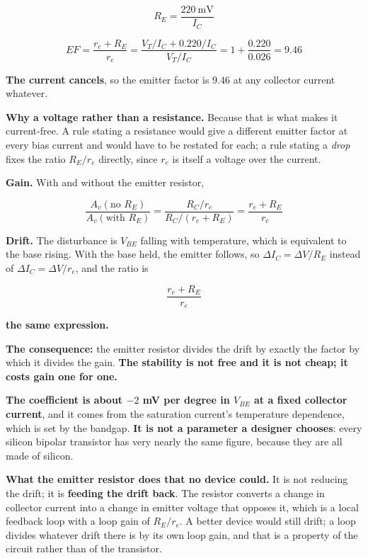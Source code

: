 
\[
  R_E = \frac{220\ \text{mV}}{I_C}
\]

\[
  EF = \frac{r_e + R_E}{r_e} = \frac{V_T/I_C + 0.220/I_C}{V_T/I_C}
  = 1 + \frac{0.220}{0.026} = \mathbf{9.46}
\]

\textbf{The current cancels}, so the emitter factor is 9.46 at any collector current whatever.

\textbf{Why a voltage rather than a resistance.} Because that is what makes it current-free. A rule stating a resistance would give a different emitter factor at every bias current and would have to be restated for each; a rule stating a \emph{drop} fixes the ratio $R_E/r_e$ directly, since $r_e$ is itself a voltage over the current.


\textbf{Gain.} With and without the emitter resistor,

\[
  \frac{A_v(\text{no } R_E)}{A_v(\text{with } R_E)} = \frac{R_C/r_e}{R_C/(r_e + R_E)}
  = \frac{r_e + R_E}{r_e}
\]

\textbf{Drift.} The disturbance is $V_{BE}$ falling with temperature, which is equivalent to the base rising. With the base held, the emitter follows, so $\Delta I_C = \Delta V/R_E$ instead of $\Delta I_C = \Delta V/r_e$, and the ratio is

\[
  \frac{r_e + R_E}{r_e}
\]

\textbf{the same expression.}

\textbf{The consequence:} the emitter resistor divides the drift by exactly the factor by which it divides the gain. \textbf{The stability is not free and it is not cheap; it costs gain one for one.}


\textbf{The coefficient is about $-2$ mV per degree in $V_{BE}$ at a fixed collector current}, and it comes from the saturation current's temperature dependence, which is set by the bandgap. \textbf{It is not a parameter a designer chooses}: every silicon bipolar transistor has very nearly the same figure, because they are all made of silicon.

\textbf{What the emitter resistor does that no device could.} It is not reducing the drift; it is \textbf{feeding the drift back}. The resistor converts a change in collector current into a change in emitter voltage that opposes it, which is a local feedback loop with a loop gain of $R_E/r_e$. A better device would still drift; a loop divides whatever drift there is by its own loop gain, and that is a property of the circuit rather than of the transistor.

